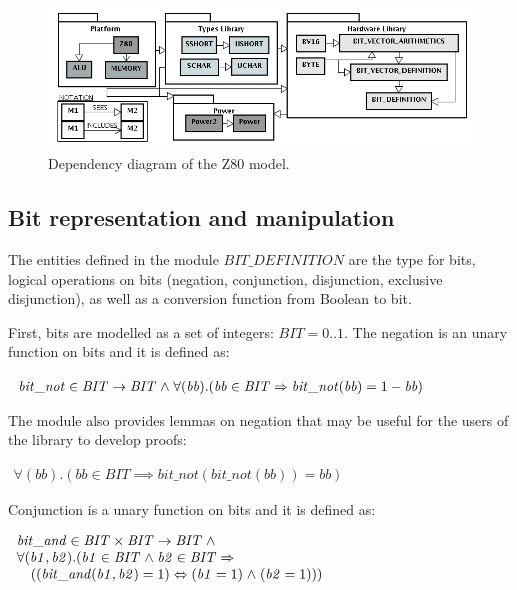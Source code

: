 \documentclass[11pt]{article} %
\begin{document}
\begin{figure}[h]
\centering
\includegraphics[width=.92\textwidth]{diagramaEstrutural_vertical.png}
 \caption{Dependency diagram of the Z80 model.}
\label{fig:hardware-definition-graph}
\end{figure}



\subsection{Bit representation and manipulation}

The entities defined in the module $\mathit{BIT\_DEFINITION}$ are the
type for bits, logical operations on bits (negation, conjunction,
disjunction, exclusive disjunction), as well as a conversion function
from Boolean to bit.

First, bits are modelled as a set of integers: $\mathit{BIT} =
\mathit{0..1}$. The negation is an unary function on bits and it is
defined as:

$
\begin{array}{l}
\mathit{bit\_not}  \in  \mathit{BIT}  \fun  \mathit{BIT}  \land \forall ( \mathit{bb}). (\mathit{bb} \in \mathit{BIT} \implies \mathit{bit\_not}(\mathit{bb}) =
1-\mathit{bb})\\
\end{array}
$

The module also provides lemmas on negation that may be useful for the
users of the library to develop proofs:

$
\begin{array}{l}
\forall (\mathit{bb}).(\mathit{bb} \in \mathit{BIT} \implies \mathit{bit\_not}(\mathit{bit\_not}(\mathit{bb})) = \mathit{bb})
\end{array}
$

Conjunction is a unary function on bits and it is defined as:

$
\begin{array}{l}
\mathit{bit\_and} \in \mathit{BIT} \times \mathit{BIT} \fun \mathit{BIT} \land \\
\forall (\mathit{b1}, \mathit{b2}).(\mathit{b1}  \in \mathit{BIT}  \land \mathit{b2} \in \mathit{BIT} \implies \\
\quad ((\mathit{bit\_and}(\mathit{b1}, \mathit{b2}) = 1) \iff (\mathit{b1} = 1)  \land  (\mathit{b2} = 1)))
\end{array}
$
\end{document}
